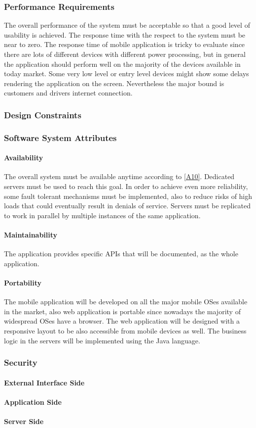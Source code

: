 \documentclass[a4paper,12pt]{article}%
\begin{document}
\subsubsection{Performance Requirements}
The overall performance of the system must be acceptable so that a good level of usability is achieved.
The response time with the respect to the system must be near to zero. The response time of mobile application is tricky to evaluate since there are lots of different devices with different power processing, but  in general the application should perform well on the majority of the devices available in today market. Some very low level or entry level devices might show some delays rendering the application on the screen. Nevertheless the major bound is customers and drivers internet connection. 
\subsubsection{Design Constraints}
\subsubsection{Software System Attributes}
\paragraph{Availability} The overall system must be available anytime according to \hyperref[a10]{[A10]}. Dedicated servers must be used to reach this goal. In order to achieve even more reliability, some fault tolerant mechanisms must be implemented, also to reduce risks of high loads that could eventually result in denials of service. Servers must be replicated to work in parallel by multiple instances of the same application. 
\paragraph{Maintainability} The application provides specific APIs that will be documented, as the whole application.
\paragraph{Portability} The mobile application will be developed on all the major mobile OSes available in the market, also web application is portable since nowadays the majority of widespread OSes have a browser. The web application will be designed with a responsive layout to be also accessible from mobile devices as well. The business logic in the servers will be implemented using the Java language.
\subsubsection{Security}
\paragraph{External Interface Side}
\paragraph{Application Side}
\paragraph{Server Side}
\end{document}
